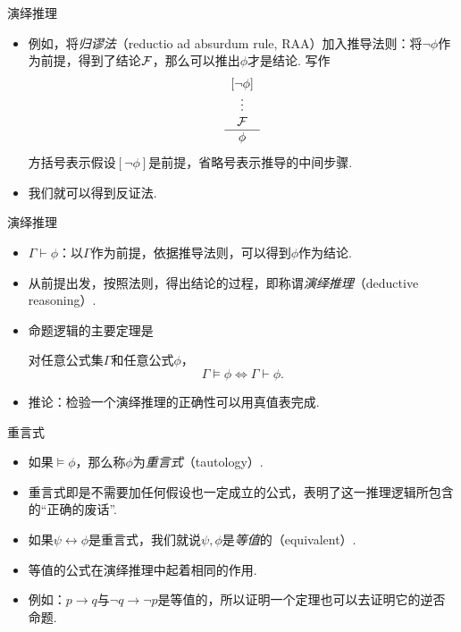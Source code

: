 \begin{frame}{演绎推理}
\begin{itemize}
    \item 例如，将\emph{归谬法}（reductio ad absurdum rule, RAA）加入推导法则：将$\neg\phi$作为前提，得到了结论$\mathcal{F}$，那么可以推出$\phi$才是结论. 写作
    \[\begin{array}{c}
         [\neg\phi]  \\
         \vdots\\
         \mathcal{F}\\\hline
         \phi
    \end{array}\]
    方括号表示假设$[\neg\phi]$是前提，省略号表示推导的中间步骤.
    \item 我们就可以得到反证法. 
\end{itemize}
\end{frame}

\begin{frame}{演绎推理}
\begin{itemize}
    \item $\Gamma\vdash\phi$：以$\Gamma$作为前提，依据推导法则，可以得到$\phi$作为结论.
    \item 从前提出发，按照法则，得出结论的过程，即称谓\emph{演绎推理}（deductive reasoning）.
    \item 命题逻辑的主要定理是
    \begin{theorem}
        对任意公式集$\Gamma$和任意公式$\phi$，
        \[\Gamma\models\phi\iff\Gamma\vdash\phi.\]
    \end{theorem}
    \item 推论：检验一个演绎推理的正确性可以用真值表完成.
\end{itemize}
\end{frame}

\begin{frame}{重言式}
\begin{itemize}
    \item 如果$\models \phi$，那么称$\phi$为\emph{重言式}（tautology）.
    \item 重言式即是不需要加任何假设也一定成立的公式，表明了这一推理逻辑所包含的``正确的废话''.
    \item 如果$\psi\leftrightarrow\phi$是重言式，我们就说$\psi,\phi$是\emph{等值}的（equivalent）.
    \item 等值的公式在演绎推理中起着相同的作用.
    \item 例如：$p\to q$与$\neg q\to\neg p$是等值的，所以证明一个定理也可以去证明它的逆否命题.
\end{itemize}
\end{frame}

